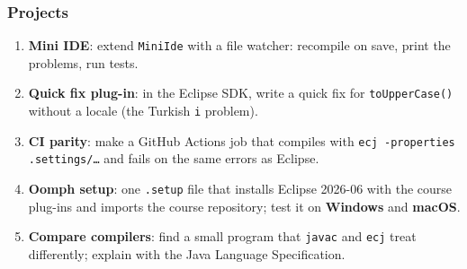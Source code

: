 \documentclass[aspectratio=169,10pt,compress]{beamer}
\newcommand{\win}{\textbf{Windows}}
\newcommand{\mac}{\textbf{macOS}}
\begin{document}
\begin{frame}[t,fragile] \frametitle{Projects}
  \begin{enumerate}\small
    \item \textbf{Mini IDE}: extend \texttt{MiniIde} with a file watcher: recompile on save, print the problems, run tests.
    \item \textbf{Quick fix plug-in}: in the Eclipse SDK, write a quick fix for \texttt{toUpperCase()} without a locale
          (the Turkish \texttt{i} problem).
    \item \textbf{CI parity}: make a GitHub Actions job that compiles with \texttt{ecj -properties .settings/\dots}
          and fails on the same errors as Eclipse.
    \item \textbf{Oomph setup}: one \texttt{.setup} file that installs Eclipse 2026-06 with the course plug-ins
          and imports the course repository; test it on \win{} and \mac.
    \item \textbf{Compare compilers}: find a small program that \texttt{javac} and \texttt{ecj} treat differently; explain
          with the Java Language Specification.
  \end{enumerate}
\end{frame}




\begin{frame}[t,fragile]
	\begin{center}
		\vspace{4cm}
	\end{center}
\end{frame}
\end{document}
